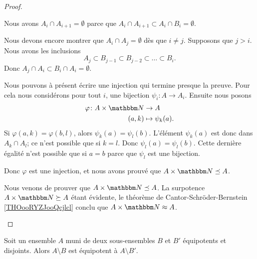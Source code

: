 \begin{proof}
\begin{subproof}
        \item[Les propriétés]
            Nous avons \( A_i\cap A_{i+1}=\emptyset\) parce que \( A_i\cap A_{i+1}\subset A_i\cap B_i=\emptyset\).

            Nous devons encore montrer que \( A_i\cap A_j=\emptyset\) dès que \( i\neq j\). Supposons que \( j>i\). Nous avons les inclusions
            \begin{equation}
                A_j\subset B_{j-1}\subset B_{j-2}\subset \ldots \subset B_i.
            \end{equation}
            Donc \( A_j\cap A_i\subset B_i\cap A_i=\emptyset\).
        \item[Une injection]
            Nous pouvons à présent écrire une injection qui termine presque la preuve. Pour cela nous considérons pour tout \( i\), une bijection \( \psi_i\colon A\to A_i\). Ensuite nous posons
            \begin{equation}
                \begin{aligned}
                    \varphi\colon A\times \eN&\to A \\
                    (a,k)&\mapsto \psi_k(a). 
                \end{aligned}
            \end{equation}
                Si \( \varphi(a,k)=\varphi(b,l)\), alors \( \psi_k(a)=\psi_l(b)\). L'élément \( \psi_k(a)\) est donc dans \( A_k\cap A_l\); ce n'est possible que si \( k=l\). Donc \( \psi_l(a)=\psi_l(b)\). Cette dernière égalité n'est possible que si \( a=b\) parce que \( \psi_l\) est une bijection.
            
                Donc \( \varphi\) est une injection, et nous avons prouvé que \( A\times \eN\preceq A\).
            \item[La bijection]
                Nous venons de prouver que \( A\times \eN\preceq A\). La surpotence \( A\times \eN\succeq A\) étant évidente, le théorème de Cantor-Schröder-Bernstein \ref{THOooRYZJooQcjlcl} conclu que \( A\times \eN\approx A\).
    \end{subproof}
\end{proof}

\begin{lemma}        \label{LEMooDHWSooFqhano}
    Soit un ensemble \( A\) muni de deux sous-ensembles \( B\) et \( B'\) équipotents et disjoints. Alors \( A\setminus B\) est équipotent à \( A\setminus B'\).
\end{lemma}

